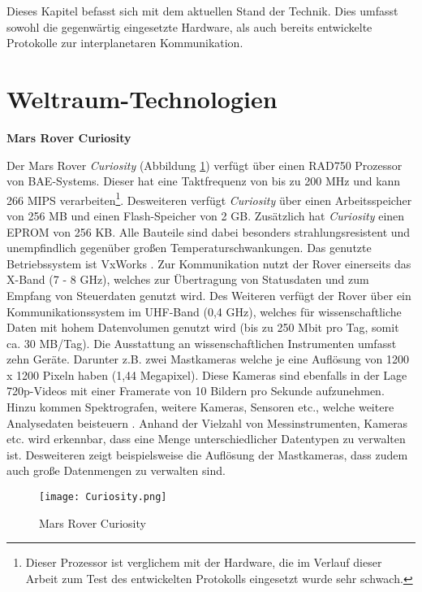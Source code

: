 \label{cap:standDerTechnik}
Dieses Kapitel befasst sich mit dem aktuellen Stand der Technik. Dies
umfasst sowohl die gegenw{\"a}rtig eingesetzte Hardware, als auch bereits
entwickelte Protokolle zur interplanetaren Kommunikation.

\section{Weltraum-Technologien}
\textbf{Mars Rover Curiosity} 

Der Mars Rover \textit{Curiosity} (Abbildung \ref{fig:Curiosity}) verf{\"u}gt
{\"u}ber einen RAD750 Prozessor von BAE-Systems.
Dieser hat eine Taktfrequenz von bis zu 200 MHz und kann 266 MIPS
verarbeiten\footnote{Dieser Prozessor ist verglichem mit der Hardware, die im
Verlauf dieser Arbeit zum Test des entwickelten Protokolls eingesetzt wurde
sehr schwach.}. Desweiteren verf{\"u}gt \textit{Curiosity} {\"u}ber einen
Arbeitsspeicher von 256 MB und einen Flash-Speicher von 2 GB. Zus{\"a}tzlich hat \textit{Curiosity} einen EPROM von 256 KB. Alle Bauteile sind dabei besonders
strahlungsresistent und unempfindlich gegen{\"u}ber gro{\ss}en
Temperaturschwankungen. Das genutzte Betriebssystem ist VxWorks \cite{WR}.
Zur Kommunikation nutzt der Rover einerseits das X-Band (7 - 8 GHz), welches zur
{\"U}bertragung von Statusdaten und zum Empfang von Steuerdaten genutzt wird.
Des Weiteren verf{\"u}gt der Rover {\"u}ber ein Kommunikationssystem im UHF-Band
(0,4 GHz), welches f{\"u}r wissenschaftliche Daten mit hohem Datenvolumen
genutzt wird (bis zu 250 Mbit pro Tag, somit ca. 30 MB/Tag). Die Ausstattung an
wissenschaftlichen Instrumenten umfasst zehn Ger{\"a}te. Darunter z.B. zwei
Mastkameras welche je eine Aufl{\"o}sung von 1200 x 1200 Pixeln haben (1,44
Megapixel). Diese Kameras sind ebenfalls in der Lage 720p-Videos mit einer
Framerate von 10 Bildern pro Sekunde aufzunehmen. Hinzu kommen Spektrografen,
weitere Kameras, Sensoren etc., welche weitere Analysedaten beisteuern
\cite{web5}. Anhand der Vielzahl von Messinstrumenten, Kameras etc. wird
erkennbar, dass eine Menge unterschiedlicher Datentypen zu verwalten ist.
Desweiteren zeigt beispielsweise die Aufl{\"o}sung der Mastkameras, dass zudem
auch gro{\ss}e Datenmengen zu verwalten sind.

\begin{figure}[H]
\centering
\texttt{[image: Curiosity.png]}
\caption[Mars Rover Curiosity]{Mars Rover Curiosity \cite{imgCuriosity}}
\label{fig:Curiosity}
\end{figure}

